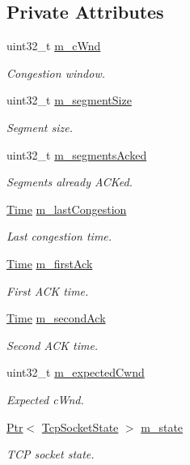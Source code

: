 \subsection*{Private Attributes}
\begin{DoxyCompactItemize}
\item 
uint32\+\_\+t \hyperlink{classTcpHtcpIncrementTest_a76dde1fff1851661480d009b05064d5d}{m\+\_\+c\+Wnd}
\begin{DoxyCompactList}\small\item\em Congestion window. \end{DoxyCompactList}\item 
uint32\+\_\+t \hyperlink{classTcpHtcpIncrementTest_ad8ec2faf12b693a0cbddd454af54aa70}{m\+\_\+segment\+Size}
\begin{DoxyCompactList}\small\item\em Segment size. \end{DoxyCompactList}\item 
uint32\+\_\+t \hyperlink{classTcpHtcpIncrementTest_a6f33c48257c870135c934ae9f1772432}{m\+\_\+segments\+Acked}
\begin{DoxyCompactList}\small\item\em Segments already A\+C\+Ked. \end{DoxyCompactList}\item 
\hyperlink{classns3_1_1Time}{Time} \hyperlink{classTcpHtcpIncrementTest_a497d4d2a1569ce8d34bbd358a71d1148}{m\+\_\+last\+Congestion}
\begin{DoxyCompactList}\small\item\em Last congestion time. \end{DoxyCompactList}\item 
\hyperlink{classns3_1_1Time}{Time} \hyperlink{classTcpHtcpIncrementTest_ae12dc2d9ff37347a0e7e11c1fa61ccf4}{m\+\_\+first\+Ack}
\begin{DoxyCompactList}\small\item\em First A\+CK time. \end{DoxyCompactList}\item 
\hyperlink{classns3_1_1Time}{Time} \hyperlink{classTcpHtcpIncrementTest_a3e1e1e7ec629ab9a9f923749cfff3c5b}{m\+\_\+second\+Ack}
\begin{DoxyCompactList}\small\item\em Second A\+CK time. \end{DoxyCompactList}\item 
uint32\+\_\+t \hyperlink{classTcpHtcpIncrementTest_acb68aafab99bed10ddc20740386adb90}{m\+\_\+expected\+Cwnd}
\begin{DoxyCompactList}\small\item\em Expected c\+Wnd. \end{DoxyCompactList}\item 
\hyperlink{classns3_1_1Ptr}{Ptr}$<$ \hyperlink{classns3_1_1TcpSocketState}{Tcp\+Socket\+State} $>$ \hyperlink{classTcpHtcpIncrementTest_acdf9e9924087e9410acd0f0060dd3131}{m\+\_\+state}
\begin{DoxyCompactList}\small\item\em T\+CP socket state. \end{DoxyCompactList}\end{DoxyCompactItemize}
